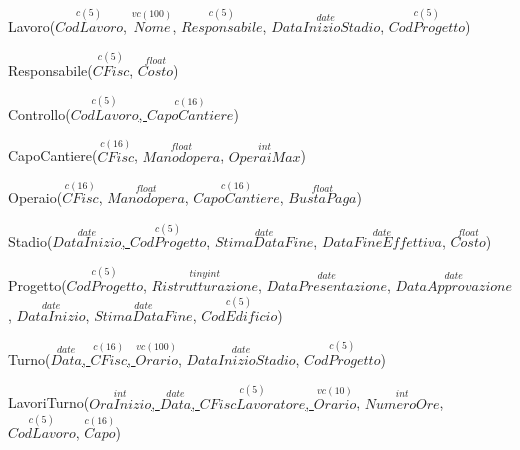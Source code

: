 \documentclass[12pt,a4paper]{report}
\begin{document}
\begin{flushleft}
\begin{footnotesize}
            Lavoro(\underline{$\overset{c(5)}{CodLavoro}$}, $\overset{vc(100)}{Nome}$, $\overset{c(5)}{Responsabile}$, $\overset{date}{DataInizioStadio}$, $\overset{c(5)}{CodProgetto}$)
            \vspace{0.5cm}
            
            Responsabile(\underline{$\overset{c(5)}{CFisc}$}, $\overset{float}{Costo}$)        
            \vspace{0.5cm}
            
            Controllo(\underline{$\overset{c(5)}{CodLavoro}$, $\overset{c(16)}{CapoCantiere}$})        
            \vspace{0.5cm}
            
            CapoCantiere(\underline{$\overset{c(16)}{CFisc}$}, $\overset{float}{Manodopera}$, $\overset{int}{OperaiMax}$)        
            \vspace{0.5cm}
            
            Operaio(\underline{$\overset{c(16)}{CFisc}$}, $\overset{float}{Manodopera}$, $\overset{c(16)}{CapoCantiere}$, $\overset{float}{BustaPaga}$)     
            \vspace{0.5cm}
            
            Stadio(\underline{$\overset{date}{DataInizio}$, $\overset{c(5)}{CodProgetto}$}, $\overset{date}{StimaDataFine}$, $\overset{date}{DataFineEffettiva}$, $\overset{float}{Costo}$)        
            \vspace{0.5cm}
            
            Progetto(\underline{$\overset{c(5)}{CodProgetto}$}, $\overset{tinyint}{Ristrutturazione}$, $\overset{date}{DataPresentazione}$, $\overset{date}{DataApprovazione}$, $\overset{date}{DataInizio}$, $\overset{date}{StimaDataFine}$, $\overset{c(5)}{CodEdificio}$)        
            \vspace{0.5cm}
            
            Turno(\underline{$\overset{date}{Data}$, $\overset{c(16)}{CFisc}$, $\overset{vc(100)}{Orario}$}, $\overset{date}{DataInizioStadio}$, $\overset{c(5)}{CodProgetto}$)        
            \vspace{0.5cm}
            
            LavoriTurno(\underline{$\overset{int}{OraInizio}$, $\overset{date}{Data}$, $\overset{c(5)}{CFiscLavoratore}$, $\overset{vc(10)}{Orario}$}, $\overset{int}{NumeroOre}$, $\overset{c(5)}{CodLavoro}$, $\overset{c(16)}{Capo}$)        
            \vspace{0.5cm}
        \end{footnotesize}        
    \end{flushleft}
\end{document}
